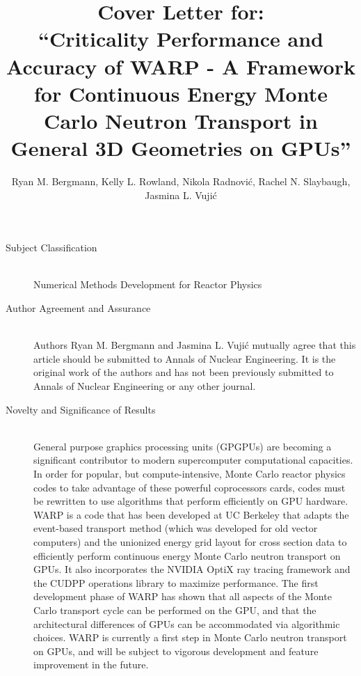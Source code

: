 \documentclass{article}
\begin{document}


\title{Cover Letter for: \\ ``Criticality Performance and Accuracy of WARP - A Framework for Continuous Energy Monte Carlo Neutron Transport in General 3D Geometries on GPUs''}
\author{Ryan M. Bergmann, Kelly L. Rowland, Nikola Radnovi\'c, Rachel N. Slaybaugh, Jasmina L. Vuji\'c}
\maketitle

\begin{description}
\item[Subject Classification] \hfill
\\
Numerical Methods Development for Reactor Physics

\item[Author Agreement and Assurance] \hfill
\\
Authors Ryan M. Bergmann and Jasmina L. Vuji\'c mutually agree that this article should be submitted to Annals of Nuclear Engineering.  It is the original work of the authors and has not been previously submitted to Annals of Nuclear Engineering or any other journal.

\item[Novelty and Significance of Results] \hfill
\\
General purpose graphics processing units (GPGPUs) are becoming a significant contributor to modern supercomputer computational capacities.  In order for popular, but compute-intensive, Monte Carlo reactor physics codes to take advantage of these powerful coprocessors cards, codes must be rewritten to use algorithms that perform efficiently on GPU hardware.  WARP is a code that has been developed at UC Berkeley that adapts the event-based transport method (which was developed for old vector computers) and the unionized energy grid layout for cross section data to efficiently perform continuous energy Monte Carlo neutron transport on GPUs.  It also incorporates the NVIDIA OptiX ray tracing framework and the CUDPP operations library to maximize performance.   The first development phase of WARP has shown that all aspects of the Monte Carlo transport cycle can be performed on the GPU, and that the architectural differences of GPUs can be accommodated via algorithmic choices.  WARP is currently a first step in Monte Carlo neutron transport on GPUs, and will be subject to vigorous development and feature improvement in the future.  

\end{description}
\end{document}
